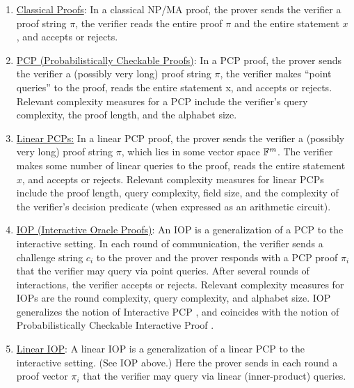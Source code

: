	\begin{enumerate}[label=\alph*.]
	
	\item{} \underline{Classical Proofs}: In a classical NP/MA proof, the prover sends the verifier a proof string $\pi$, the verifier reads the entire proof $\pi$ and the entire statement $x$, and accepts or rejects.
  
	\item{} \underline{PCP (Probabilistically Checkable Proofs)}: In a PCP proof, the prover sends the verifier a (possibly very long) proof string $\pi$, the verifier makes “point queries” to the proof, reads the entire statement x, and accepts or rejects. Relevant complexity measures for a PCP include the verifier’s query complexity, the proof length, and the alphabet size.
  
	\item{} \underline{Linear PCPs:} In a linear PCP proof, the prover sends the verifier a (possibly very long) proof string $\pi$, which lies in some vector space $\mathbb{F}^m$. 
	The verifier makes some number of linear queries to the proof, reads the entire statement $x$, and accepts or rejects. 
	Relevant complexity measures for linear PCPs include the proof length, query complexity, field size, and the complexity of the verifier’s decision predicate (when expressed as an arithmetic circuit).
  
	\item{} \underline{IOP (Interactive Oracle Proofs)}: 
	An IOP is a generalization of a PCP to the interactive setting. 
	In each round of communication, the verifier sends a challenge string $c_i$ to the prover and the prover responds with a PCP proof $\pi_i$ that the verifier may query via point queries.
	After several rounds of interactions, the verifier accepts or rejects. 
	Relevant complexity measures for IOPs are the round complexity, query complexity, and alphabet size. 
	IOP generalizes the notion of Interactive PCP \cite{2008:icalp:interactive-PCP}, and coincides with the notion of Probabilistically Checkable Interactive Proof \cite{2016:stoc:Constant-round-Interactive-Proofs-for-Delegating-Computation}.
  
	\item{} \underline{Linear IOP}: 
	A linear IOP is a generalization of a linear PCP to the interactive setting. (See IOP above.) 
	Here the prover sends in each round a proof vector $\pi_i$ that the verifier may query via linear (inner-product) queries.
  

\end{enumerate}
